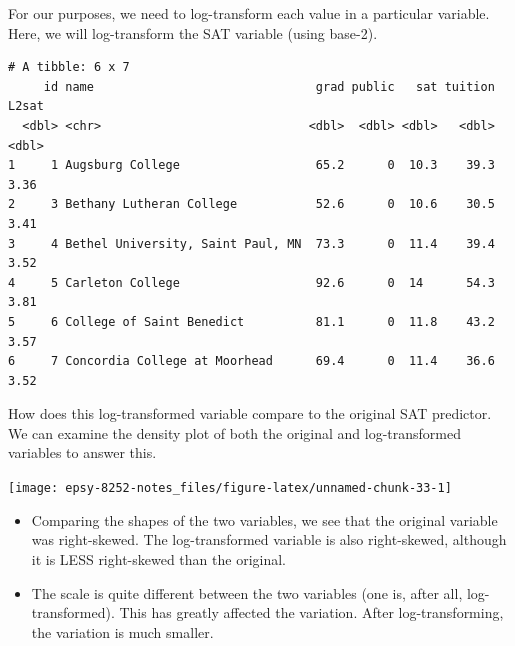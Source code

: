 \documentclass[]{book}
\newenvironment{Shaded}{\begin{snugshade}}{\end{snugshade}}
\newcommand{\DataTypeTok}[1]{\textcolor[rgb]{0.13,0.29,0.53}{#1}}
\newcommand{\DecValTok}[1]{\textcolor[rgb]{0.00,0.00,0.81}{#1}}
\newcommand{\KeywordTok}[1]{\textcolor[rgb]{0.13,0.29,0.53}{\textbf{#1}}}
\newcommand{\NormalTok}[1]{#1}
\newcommand{\OperatorTok}[1]{\textcolor[rgb]{0.81,0.36,0.00}{\textbf{#1}}}
\newcommand{\StringTok}[1]{\textcolor[rgb]{0.31,0.60,0.02}{#1}}
\providecommand{\tightlist}{%
  \setlength{\itemsep}{0pt}\setlength{\parskip}{0pt}}
\begin{document}
For our purposes, we need to log-transform each value in a particular variable. Here, we will log-transform the SAT variable (using base-2).

\begin{Shaded}
\end{Shaded}

\begin{verbatim}
# A tibble: 6 x 7
     id name                               grad public   sat tuition L2sat
  <dbl> <chr>                             <dbl>  <dbl> <dbl>   <dbl> <dbl>
1     1 Augsburg College                   65.2      0  10.3    39.3  3.36
2     3 Bethany Lutheran College           52.6      0  10.6    30.5  3.41
3     4 Bethel University, Saint Paul, MN  73.3      0  11.4    39.4  3.52
4     5 Carleton College                   92.6      0  14      54.3  3.81
5     6 College of Saint Benedict          81.1      0  11.8    43.2  3.57
6     7 Concordia College at Moorhead      69.4      0  11.4    36.6  3.52
\end{verbatim}

How does this log-transformed variable compare to the original SAT predictor. We can examine the density plot of both the original and log-transformed variables to answer this.

\begin{center}\texttt{[image: epsy-8252-notes\_files/figure-latex/unnamed-chunk-33-1]} \end{center}

\begin{itemize}
\tightlist
\item
  Comparing the shapes of the two variables, we see that the original variable was right-skewed. The log-transformed variable is also right-skewed, although it is LESS right-skewed than the original.
\item
  The scale is quite different between the two variables (one is, after all, log-transformed). This has greatly affected the variation. After log-transforming, the variation is much smaller.
\end{itemize}
\end{document}

